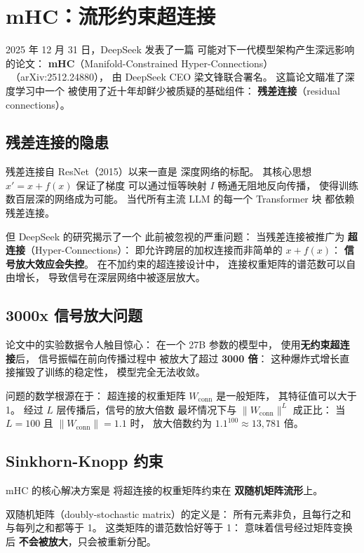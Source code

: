 \section{mHC：流形约束超连接}
\label{sec:mhc}

2025 年 12 月 31 日，DeepSeek 发表了一篇
可能对下一代模型架构产生深远影响的论文：
\textbf{mHC}（Manifold-Constrained Hyper-Connections）
~\cite{mhc2025}（arXiv:2512.24880），
由 DeepSeek CEO 梁文锋联合署名。
这篇论文瞄准了深度学习中一个
被使用了近十年却鲜少被质疑的基础组件：
\textbf{残差连接}（residual connections）。

\subsection{残差连接的隐患}

残差连接自 ResNet（2015）以来一直是
深度网络的标配。
其核心思想 $x' = x + f(x)$ 保证了梯度
可以通过恒等映射 $I$ 畅通无阻地反向传播，
使得训练数百层深的网络成为可能。
当代所有主流 LLM 的每一个 Transformer 块
都依赖残差连接。

但 DeepSeek 的研究揭示了一个
此前被忽视的严重问题：
当残差连接被推广为
\textbf{超连接}（Hyper-Connections）：
即允许跨层的加权连接而非简单的 $x + f(x)$：
\textbf{信号放大效应会失控}。
在不加约束的超连接设计中，
连接权重矩阵的谱范数可以自由增长，
导致信号在深层网络中被逐层放大。

\subsection{3000x 信号放大问题}

论文中的实验数据令人触目惊心：
在一个 27B 参数的模型中，
使用\textbf{无约束超连接}后，
信号振幅在前向传播过程中
被放大了超过 \textbf{3000 倍}：
这种爆炸式增长直接摧毁了训练的稳定性，
模型完全无法收敛。

问题的数学根源在于：
超连接的权重矩阵 $W_{\mathrm{conn}}$ 是一般矩阵，
其特征值可以大于 1。
经过 $L$ 层传播后，信号的放大倍数
最坏情况下与 $\|W_{\mathrm{conn}}\|^L$ 成正比：
当 $L = 100$ 且 $\|W_{\mathrm{conn}}\| = 1.1$ 时，
放大倍数约为 $1.1^{100} \approx 13{,}781$ 倍。

\subsection{Sinkhorn-Knopp 约束}

mHC 的核心解决方案是
将超连接的权重矩阵约束在
\textbf{双随机矩阵流形}上。

双随机矩阵（doubly-stochastic matrix）的定义是：
所有元素非负，且每行之和与每列之和都等于 1。
这类矩阵的谱范数恰好等于 1：
意味着信号经过矩阵变换后
\textbf{不会被放大}，只会被重新分配。

